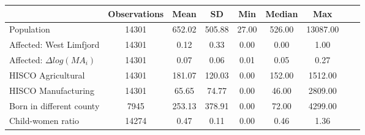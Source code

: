 \begin{tabular}{lcccccccc}
\toprule
  & Observations & Mean & SD & Min & Median & Max\\
\midrule
Population & 14301 & 652.02 & 505.88 & 27.00 & 526.00 & 13087.00\\
Affected: West Limfjord & 14301 & 0.12 & 0.33 & 0.00  & 0.00 & 1.00\\
Affected: $\Delta log(MA_i)$ & 14301 & 0.07 & 0.06 & 0.01 & 0.05& 0.27\\
HISCO Agricultural & 14301 & 181.07 & 120.03 & 0.00 & 152.00 & 1512.00\\
HISCO Manufacturing & 14301 & 65.65 & 74.77 & 0.00 & 46.00 & 2809.00\\
Born in different county & 7945 & 253.13 & 378.91 & 0.00 & 72.00  & 4299.00\\
Child-women ratio & 14274 & 0.47 & 0.11 & 0.00 & 0.46 & 1.36\\
\bottomrule
\end{tabular}